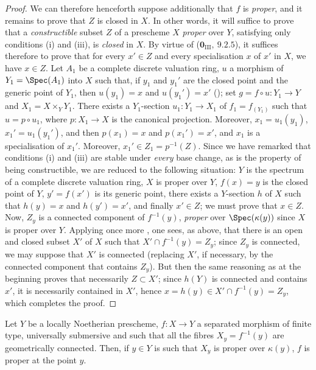 \begin{proof}
We can therefore henceforth suppose additionally that $f$ is \emph{proper}, and it remains to prove that $Z$ is closed in $X$.
In other words, it will suffice to prove that a \emph{constructible} subset $Z$ of a prescheme $X$ \emph{proper} over $Y$, satisfying only conditions (i) and (iii), is \emph{closed} in $X$.
By virtue of ($\mathbf{0}_{\mathrm{III}},~9.2.5$), it suffices therefore to prove that for every $x'\in Z$ and every specialisation $x$ of $x'$ in $X$, we have $x\in Z$.
Let $A_1$ be a complete discrete valuation ring, $u$ a morphism of $Y_1=\Spec(A_1)$ into $X$ such that, if $y_1$ and $y_1'$ are the closed point and the generic point of $Y_1$, then $u(y_1)=x$ and $u(y_1')=x'$ (); set $g=f\circ u:Y_1\to Y$ and $X_1=X\times_Y Y_1$. There exists a $Y_1$-section $u_1:Y_1\to X_1$ of $f_1=f_{(Y_1)}$ such that $u=p\circ u_1$, where $p:X_1\to X$ is the canonical projection.
Moreover, $x_1=u_1(y_1)$, $x_1'=u_1(y_1')$, and then $p(x_1)=x$ and $p(x_1')=x'$, and $x_1$ is a specialisation of $x_1'$.
Moreover, $x_1'\in Z_1=p^{-1}(Z)$. Since we have remarked that conditions (i) and (iii) are stable under \emph{every} base change, as is the property of being constructible, we are reduced to the following situation: $Y$ is the spectrum of a complete discrete valuation ring, $X$ is proper over $Y$, $f(x)=y$ is the closed point of $Y$, $y'=f(x')$ is its generic point, there exists a $Y$-section $h$ of $X$ such that $h(y)=x$ and $h(y')=x'$, and finally $x'\in Z$; we must prove that $x\in Z$.
Now, $Z_y$ is a connected component of $f^{-1}(y)$, \emph{proper} over $\Spec(\kappa(y))$ since $X$ is proper over $Y$.
Applying once more , one sees, as above, that there is an open and closed subset $X'$ of $X$ such that $X'\cap f^{-1}(y)=Z_y$; since $Z_y$ is connected,
we may suppose that $X'$ is connected (replacing $X'$, if necessary, by the connected component that contains $Z_y$).
But then the same reasoning as at the beginning proves that necessarily $Z\subset X'$; since $h(Y)$ is connected and contains $x'$, it is necessarily contained in $X'$, hence $x=h(y)\in X'\cap f^{-1}(y)=Z_y$, which completes the proof.
\end{proof}

\begin{corollary}[15.7.10]
\label{IV.15.7.10}
Let $Y$ be a locally Noetherian prescheme, $f:X\to Y$ a separated morphism of finite type, universally submersive  and such that all the fibres $X_y=f^{-1}(y)$ are geometrically connected.
Then, if $y\in Y$ is such that $X_y$ is proper over $\kappa(y)$, $f$ is proper at the point $y$.
\end{corollary}

